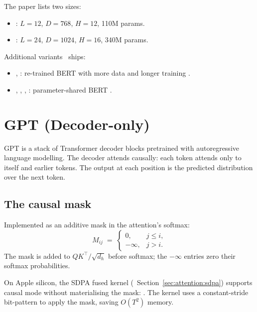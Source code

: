 The paper lists two sizes:
\begin{itemize}
  \item {}: $L = 12$, $D = 768$, $H = 12$,
    110M params.
  \item {}: $L = 24$, $D = 1024$, $H = 16$,
    340M params.
\end{itemize}

Additional variants \Lucid\ ships:
\begin{itemize}
  \item {}, :
    re-trained BERT with more data and longer training
    \cite{liu_roberta_2019}.
  \item {}, ,
    , :
    parameter-shared BERT \cite{lan_albert_2020}.
\end{itemize}

\section{GPT (Decoder-only)}
\label{sec:language_models:gpt}

GPT \cite{radford_gpt2_2019, brown_gpt3_2020} is a stack of
Transformer decoder blocks pretrained with autoregressive
language modelling. The decoder attends causally: each token
attends only to itself and earlier tokens. The output at each
position is the predicted distribution over the next token.

\subsection{The causal mask}
\label{ssec:language_models:causal_mask}

Implemented as an additive mask in the attention's softmax:
\[
  M_{ij} \;=\;
  \begin{cases}
    0, & j \leq i, \\
    -\infty, & j > i.
  \end{cases}
\]
The mask is added to $QK^\top/\sqrt{d_h}$ before softmax;
the $-\infty$ entries zero their softmax probabilities.

On Apple silicon, the SDPA fused kernel
(~Section~\ref{sec:attention:sdpa}) supports
causal mode without materialising the mask:
.
The kernel uses a constant-stride bit-pattern to apply the
mask, saving $O(T^2)$ memory.

